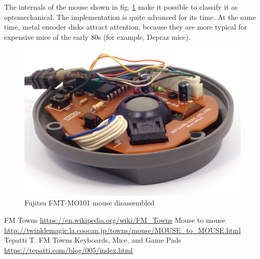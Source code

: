 \documentclass[11pt, a4paper]{article}
\begin{document}
The internals of the mouse shown in fig. \ref{fig:FMT1Inside} make it possible to classify it as optomechanical. The implementation is quite advanced for its time. At the same time, metal encoder disks attract attention, because they are more typical for expensive mice of the early 80s (for example, Depraz mice).

\begin{figure}[h]
    \centering
    \includegraphics[scale=0.8]{1989_fujitsu_fmt_mo101_mouse/inside_30.jpg}
    \caption{Fujitsu FMT-MO101 mouse disassembled}
    \label{fig:FMT1Inside}
\end{figure}


\begin{thebibliography}{9}
     FM Towns \url{https://en.wikipedia.org/wiki/FM_Towns}
     Mouse to mouse \url{http://twinklemagic.la.coocan.jp/towns/mouse/MOUSE_to_MOUSE.html} 
     Tepatti T. FM Towns Keyboards, Mice, and Game Pads \url{https://tepatti.com/blog/005/index.html}
\end{thebibliography}
\end{document}
